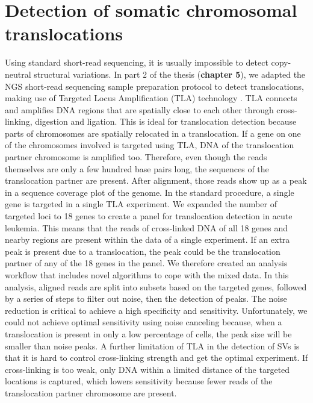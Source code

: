 \section[Detection of somatic chromosomal translocations]{Detection of somatic chromosomal \newline translocations} \label{Somatic}
Using standard short-read sequencing, it is usually impossible to detect copy-neutral structural variations. 
In part 2 of the thesis (\textbf{chapter 5}), we adapted the NGS short-read sequencing sample preparation protocol to detect translocations, making use of Targeted Locus Amplification (TLA) technology \cite{de_Vree_2014}. 
TLA connects and amplifies DNA regions that are spatially close to each other through cross-linking, digestion and ligation. 
This is ideal for translocation detection because parts of chromosomes are spatially relocated in a translocation. 
If a gene on one of the chromosomes involved is targeted using TLA, DNA of the translocation partner chromosome is amplified too. 
Therefore, even though the reads themselves are only a few hundred base pairs long, the sequences of the translocation partner are present. 
After alignment, those reads show up as a peak in a sequence coverage plot of the genome. 
In the standard procedure, a single gene is targeted in a single TLA experiment. 
We expanded the number of targeted loci to 18 genes to create a panel for translocation detection in acute leukemia. 
This means that the reads of cross-linked DNA of all 18 genes and nearby regions are present within the data of a single experiment. 
If an extra peak is present due to a translocation, the peak could be the translocation partner of any of the 18 genes in the panel. 
We therefore created an analysis workflow that includes novel algorithms to cope with the mixed data. In this analysis, aligned reads are split into subsets based on the targeted genes, followed by a series of steps to filter out noise, then the detection of peaks. 
The noise reduction is critical to achieve a high specificity and sensitivity. Unfortunately, we could not achieve optimal sensitivity using noise canceling because, when a translocation is present in only a low percentage of cells, the peak size will be smaller than noise peaks. 
A further limitation of TLA in the detection of SVs is that it is hard to control cross-linking strength and get the optimal experiment. 
If cross-linking is too weak, only DNA within a limited distance of the targeted locations is captured, which lowers sensitivity because fewer reads of the translocation partner chromosome are present. 
